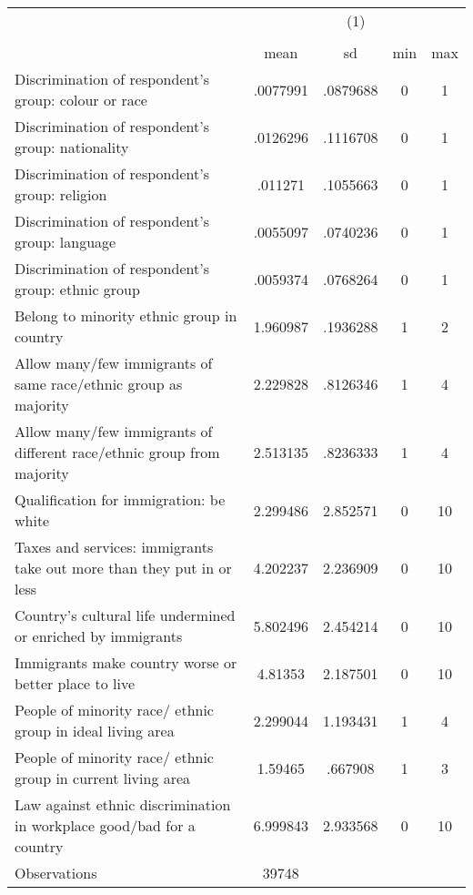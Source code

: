 {
\def\sym#1{\ifmmode^{#1}\else\(^{#1}\)\fi}
\begin{tabular}{l*{1}{cccc}}
\hline\hline
                    &\multicolumn{4}{c}{(1)}                            \\
                    &\multicolumn{4}{c}{}                               \\
                    &        mean&          sd&         min&         max\\
\hline
Discrimination of respondent's group: colour or race&    .0077991&    .0879688&           0&           1\\
Discrimination of respondent's group: nationality&    .0126296&    .1116708&           0&           1\\
Discrimination of respondent's group: religion&     .011271&    .1055663&           0&           1\\
Discrimination of respondent's group: language&    .0055097&    .0740236&           0&           1\\
Discrimination of respondent's group: ethnic group&    .0059374&    .0768264&           0&           1\\
Belong to minority ethnic group in country&    1.960987&    .1936288&           1&           2\\
Allow many/few immigrants of same race/ethnic group as majority&    2.229828&    .8126346&           1&           4\\
Allow many/few immigrants of different race/ethnic group from majority&    2.513135&    .8236333&           1&           4\\
Qualification for immigration: be white&    2.299486&    2.852571&           0&          10\\
Taxes and services: immigrants take out more than they put in or less&    4.202237&    2.236909&           0&          10\\
Country's cultural life undermined or enriched by immigrants&    5.802496&    2.454214&           0&          10\\
Immigrants make country worse or better place to live&     4.81353&    2.187501&           0&          10\\
People of minority race/ ethnic group in ideal living area&    2.299044&    1.193431&           1&           4\\
People of minority race/ ethnic group in current living area&     1.59465&     .667908&           1&           3\\
Law against ethnic discrimination in workplace good/bad for a country&    6.999843&    2.933568&           0&          10\\
\hline
Observations        &       39748&            &            &            \\
\hline\hline
\end{tabular}
}

